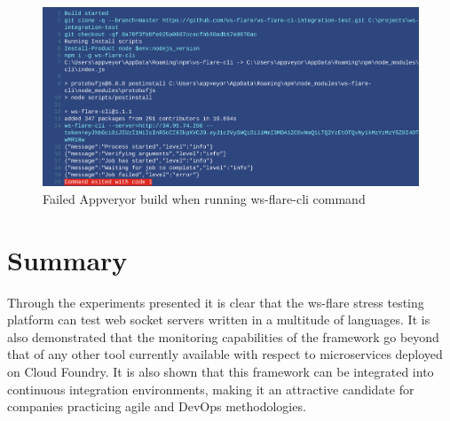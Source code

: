 \begin{figure}[H]
  \centering
    \includegraphics[width=1\textwidth]{figures/experiments/experiment-3/appveyor-output-failed.png}
    \caption{Failed Appveryor build when running ws-flare-cli command}
    \label{fig:experiment-3-appveyor-log-failed}
\end{figure}

\section{Summary}

Through the experiments presented it is clear that the ws-flare stress testing platform can test web socket servers written in a multitude of languages. It is also demonstrated that the monitoring capabilities of the framework go beyond that of any other tool currently available with respect to microservices deployed on Cloud Foundry. It is also shown that this framework can be integrated into continuous integration environments, making it an attractive candidate for companies practicing agile and DevOps methodologies.